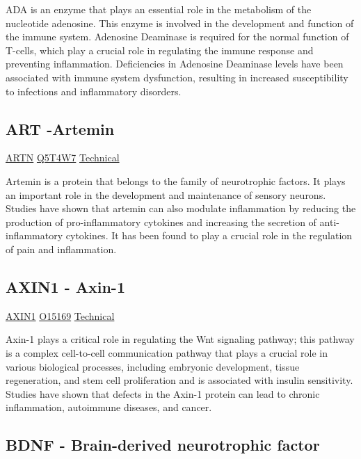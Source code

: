 ADA is an enzyme that plays an essential role in the metabolism of the nucleotide adenosine. This enzyme is involved in the development and function of the immune system. Adenosine Deaminase is required for the normal function of T-cells, which play a crucial role in regulating the immune response and preventing inflammation. Deficiencies in Adenosine Deaminase levels have been associated with immune system dysfunction, resulting in increased susceptibility to infections and inflammatory disorders.


\subsection{ART -Artemin}

\href{https://en.wikipedia.org/wiki/Artemin}{ARTN}
\href{http://www.uniprot.org/uniprot/Q5T4W7}{Q5T4W7}
\href{https://olink.com/products-services/target/protein/?assayID=5102}{Technical}


Artemin is a protein that belongs to the family of neurotrophic factors. It plays an important role in the development and maintenance of sensory neurons. Studies have shown that artemin can also modulate inflammation by reducing the production of pro-inflammatory cytokines and increasing the secretion of anti-inflammatory cytokines. It has been found to play a crucial role in the regulation of pain and inflammation.

\subsection{AXIN1 - Axin-1}

\href{https://en.wikipedia.org/wiki/AXIN1}{AXIN1}
\href{http://www.uniprot.org/uniprot/O15169}{O15169}
\href{https://olink.com/products-services/target/protein/?assayID=5078}{Technical}

Axin-1 plays a critical role in regulating the Wnt signaling pathway; this pathway is a complex cell-to-cell communication pathway that plays a crucial role in various biological processes, including embryonic development, tissue regeneration, and stem cell proliferation and is associated with insulin sensitivity. Studies have shown that defects in the Axin-1 protein can lead to chronic inflammation, autoimmune diseases, and cancer.

\subsection{BDNF - Brain-derived neurotrophic factor}

